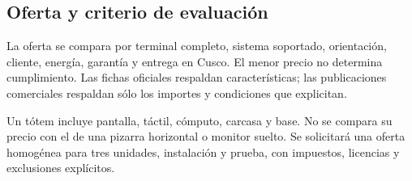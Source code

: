 \subsection{Oferta y criterio de evaluación}
La oferta se compara por terminal completo, sistema soportado, orientación, cliente, energía, garantía y entrega en Cusco. El menor precio no determina cumplimiento. Las fichas oficiales respaldan características; las publicaciones comerciales respaldan sólo los importes y condiciones que explicitan.

Un tótem incluye pantalla, táctil, cómputo, carcasa y base. No se compara su precio con el de una pizarra horizontal o monitor suelto. Se solicitará una oferta homogénea para tres unidades, instalación y prueba, con impuestos, licencias y exclusiones explícitos.


